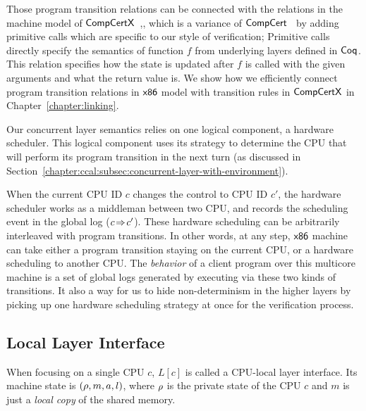 Those program transition relations can be connected with the relations 
in the machine model of $\mathsf{CompCertX}$~\cite{deepspec},, 
which is a variance of $\mathsf{CompCert}$~\cite{leroy09}
by adding primitive calls which are specific to our style of verification;
Primitive calls
directly specify the semantics of function $f$ from underlying layers 
defined in $\mathsf{Coq}$. This relation specifies how the state is updated after $f$
is called with the given arguments and what the return value is.
We show how we efficiently connect 
program transition relations in 
$\mathsf{x86}$ model with transition rules in $\mathsf{CompCertX}$ in Chapter~\ref{chapter:linking}.


Our concurrent layer semantics relies on 
one logical component, a hardware scheduler. 
This logical component uses its strategy 
to determine 
the CPU that will perform its program transition in the next turn (as discussed in Section~\ref{chapter:ccal:subsec:concurrent-layer-with-environment}).

When the current CPU ID $c$ changes
the control to CPU ID $c'$,
the hardware scheduler works as a
middleman between 
two CPU, and records the scheduling event 
in the global log ($c \!\Rightarrow\! c'$).
These hardware scheduling
can be arbitrarily interleaved with
program transitions.
In other words, at any step,
$\mathsf{x86}$ machine can take either a program transition staying
on the current CPU,
or a hardware scheduling to another CPU.
The \emph{behavior} of a client program  over this multicore machine is  a set of global logs generated by executing  via these two kinds of transitions.
It also a 
way for us to hide non-determinism in the higher layers
by picking up 
one hardware scheduling strategy at once for the verification process.


\subsection{Local Layer Interface}
\label{chapter:ccal:subsec:local-layer-interface}

When focusing on a single CPU $c$, $L[c]$ is called 
a CPU-local layer interface.
Its machine state is $(\rho, m, a, l)$,
where $\rho$ is the private state of the CPU $c$
and $m$ is just a \emph{local copy} of the shared memory.

